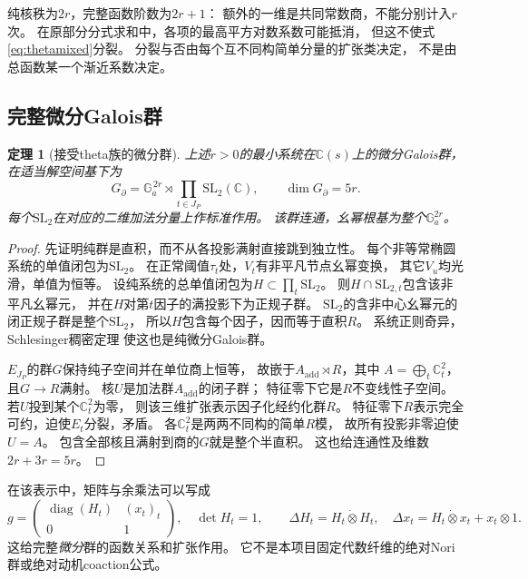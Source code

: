 \documentclass[11pt,a4paper]{ctexart}
\theoremstyle{cnplain}\newtheorem{theorem}{定理}[section]
\theoremstyle{definition}\newtheorem{definition}[theorem]{定义}
\theoremstyle{remark}\newtheorem{remark}[theorem]{注}
\begin{document}
纯核秩为$2r$，完整函数阶数为$2r+1$：
额外的一维是共同常数商，不能分别计入$r$次。
在原部分分式求和中，各项的最高平方对数系数可能抵消，
但这不使式\eqref{eq:thetamixed}分裂。
分裂与否由每个互不同构简单分量的扩张类决定，
不是由总函数某一个渐近系数决定。

\subsection{完整微分Galois群}
\begin{theorem}[接受theta族的微分群]\label{thm:thetadgal}
上述$r>0$的最小系统在$\mathbb C(s)$上的微分Galois群，
在适当解空间基下为
\begin{equation}\label{eq:thetadgal}
 G_{\partial}=
 \mathbb G_a^{\,2r}\rtimes\prod_{t\in J_P}\mathrm{SL}_2(\mathbb C),
 \qquad \dim G_{\partial}=5r.
\end{equation}
每个$\mathrm{SL}_2$在对应的二维加法分量上作标准作用。
该群连通，幺幂根基为整个$\mathbb G_a^{2r}$。
\end{theorem}
\begin{proof}
先证明纯群是直积，而不从各投影满射直接跳到独立性。
每个非等常椭圆系统的单值闭包为$\mathrm{SL}_2$。
在正常阈值$\tau_t$处，$V_t$有非平凡节点幺幂变换，
其它$V_u$均光滑，单值为恒等。
设纯系统的总单值闭包为$H\subset\prod_t\mathrm{SL}_2$。
则$H\cap\mathrm{SL}_{2,t}$包含该非平凡幺幂元，
并在$H$对第$t$因子的满投影下为正规子群。
$\mathrm{SL}_2$的含非中心幺幂元的闭正规子群是整个$\mathrm{SL}_2$，
所以$H$包含每个因子，因而等于直积$R$。
系统正则奇异，Schlesinger稠密定理
\cite[Proposition1.3.27]{Singer}使这也是纯微分Galois群。

$E_{J_P}$的群$G$保持纯子空间并在单位商上恒等，
故嵌于$A_{\mathrm{add}}\rtimes R$，其中
$A=\bigoplus_t\mathbb C^2_t$，且$G\to R$满射。
核$U$是加法群$A_{\mathrm{add}}$的闭子群；
特征零下它是$R$不变线性子空间。
若$U$投到某个$\mathbb C_t^2$为零，
则该三维扩张表示因子化经约化群$R$。
特征零下$R$表示完全可约，迫使$E_t$分裂，矛盾。
各$\mathbb C^2_t$是两两不同构的简单$R$模，
故所有投影非零迫使$U=A$。
包含全部核且满射到商的$G$就是整个半直积。
这也给连通性及维数$2r+3r=5r$。
\end{proof}

在该表示中，矩阵与余乘法可以写成
\[
 g=\begin{pmatrix}\operatorname{diag}(H_t)&(x_t)_t\\0&1\end{pmatrix},
 \quad \det H_t=1,\qquad
 \Delta H_t=H_t\mathbin{\dot\otimes}H_t,\quad
 \Delta x_t=H_t\mathbin{\dot\otimes}x_t+x_t\otimes1 .
\]
这给完整\emph{微分}群的函数关系和扩张作用。
它不是本项目固定代数纤维的绝对Nori群或绝对动机coaction公式。
\end{document}
